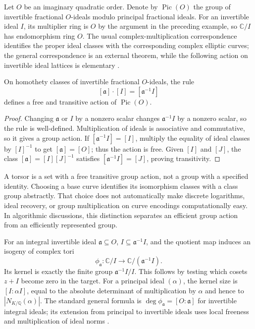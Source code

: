 Let $O$ be an imaginary quadratic order. Denote by
$\operatorname{Pic}(O)$ the group of invertible fractional
$O$-ideals modulo principal fractional ideals. For an invertible
ideal $I$, its multiplier ring is $O$ by the argument in the
preceding example, so $\mathbb C/I$ has endomorphism ring $O$.
The usual complex-multiplication correspondence identifies the
proper ideal classes with the corresponding complex elliptic curves;
the general correspondence is an external theorem, while the
following action on invertible ideal lattices is elementary
\cite{Sutherland2023CMTorsor}.

\begin{proposition}
On homothety classes of invertible fractional $O$-ideals, the rule
\[
 [\mathfrak a]\cdot[I]=[\mathfrak a^{-1}I]
\]
defines a free and transitive action of $\operatorname{Pic}(O)$.
\end{proposition}

\begin{proof}
Changing $\mathfrak a$ or $I$ by a nonzero scalar changes
$\mathfrak a^{-1}I$ by a nonzero scalar, so the rule is
well-defined. Multiplication of ideals is associative and
commutative, so it gives a group action. If
$[\mathfrak a^{-1}I]=[I]$, multiply the equality of ideal classes
by $[I]^{-1}$ to get $[\mathfrak a]=[O]$; thus the action is
free. Given $[I]$ and $[J]$, the class
$[\mathfrak a]=[I][J]^{-1}$ satisfies
$[\mathfrak a^{-1}I]=[J]$, proving transitivity.
\end{proof}

A torsor is a set with a free transitive group action, not a group
with a specified identity. Choosing a base curve identifies its
isomorphism classes with a class group abstractly. That choice
does not automatically make discrete logarithms, ideal recovery,
or group multiplication on curve encodings computationally easy.
In algorithmic discussions, this distinction separates an efficient
group action from an efficiently represented group.

For an integral invertible ideal $\mathfrak a\subseteq O$,
$I\subseteq\mathfrak a^{-1}I$, and the quotient map induces an
isogeny of complex tori
\[
 \phi_{\mathfrak a}:\mathbb C/I\longrightarrow
 \mathbb C/(\mathfrak a^{-1}I).
\]
Its kernel is exactly the finite group
$\mathfrak a^{-1}I/I$. This follows by testing which cosets
$z+I$ become zero in the target. For a principal ideal
$(\alpha)$, the kernel size is
$[I:\alpha I]$, equal to the absolute determinant of
multiplication by $\alpha$ and hence to
$|N_{K/\mathbb Q}(\alpha)|$. The standard general formula is
$\deg\phi_{\mathfrak a}=[O:\mathfrak a]$ for invertible
integral ideals; its extension from principal to invertible
ideals uses local freeness and multiplication of ideal norms
\cite{Sutherland2023ModularCurves}.

